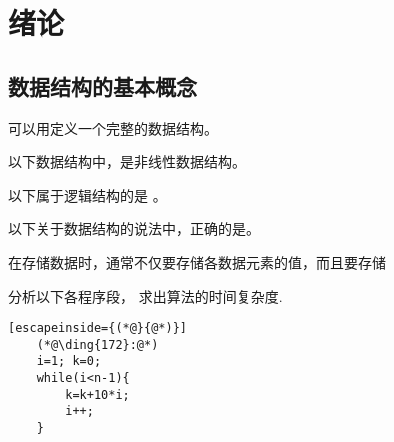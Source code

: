 \clearpage
\clearpage
\section{绪论}
\subsection{数据结构的基本概念}
\qnum \quad {}

\begin{questions}[tr]
    \begin{bbox}
        \question[2] 可以用\blankbox 定义一个完整的数据结构。
    \end{bbox}

    \begin{bbox}
        \question[2] 以下数据结构中，\blankbox 是非线性数据结构。
    \end{bbox}

    \begin{bbox}
 
        \question[2] 以下属于逻辑结构的是 \blankbox 。
        
    \end{bbox}

 

    \begin{bbox}
        \question[2] 以下关于数据结构的说法中，正确的是\blankbox 。
    \end{bbox}

    \begin{bbox}
        \question[2] 在存储数据时，通常不仅要存储各数据元素的值，而且要存储\blankbox
    \end{bbox}

    \begin{bbox}
        \question[2] 分析以下各程序段， 求出算法的时间复杂度.
        \begin{lstlisting}[escapeinside={(*@}{@*)}]
    (*@\ding{172}:@*)
    i=1; k=0;
    while(i<n-1){
        k=k+10*i;
        i++;
    }


\end{lstlisting}
\end{bbox}
\end{questions}
